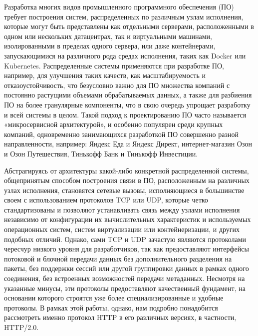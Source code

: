 \documentclass[times]{itmo-student-thesis}
\begin{document}

\tableofcontents

\startprefacepage

Разработка многих видов промышленного программного обеспечения (ПО) требует построения систем, распределенных по различным узлам исполнения,
которые могут быть представлены как отдельными серверами, расположенными в одном или нескольких датацентрах, так и виртуальными машинами, изолированными в пределах одного сервера,
или даже контейнерами, запускающимися на различного рода средах исполнения, таких как Docker или Kubernetes.
Распределенные системы применяются при разработке ПО, например, для улучшения таких качеств, как масштабируемость и отказоустойчивость,
что безусловно важно для ПО множества компаний с постоянно растущими объемами обрабатываемых данных,
а также для разбиения ПО на более гранулярные компоненты, что в свою очередь упрощает разработку и всей системы в целом.
Такой подход к проектированию ПО часто называется «микросервисной архитектурой», и особенно популярен среди крупных компаний,
одновременно занимающихся разработкой ПО совершенно разной направленности, например: Яндекс Еда и Яндекс Директ, интернет-магазин Озон и Озон Путешествия, Тинькофф Банк и Тинькофф Инвестиции. 

Абстрагируясь от архитектуры какой-либо конкретной распределенной системы, общепринятым способом построения связи в ПО, расположенным на различных узлах исполнения,
становятся сетевые вызовы, исполняющиеся в большинстве своем с использованием протоколов TCP или UDP, которые четко стандартизованы и позволяют устанавливать связь между
узлами исполнения независимо от конфигурации их вычислительных характеристик и используемых операционных систем, систем виртуализации или контейнеризации, и других подобных отличий.
Однако, сами TCP и UDP зачастую являются протоколами чересчур низкого уровня для разработчиков, так как предоставляют интерфейсы потоковой и блочной передачи данных
без дополнительного разделения на пакеты, без поддержки сессий или другой группировки данных в рамках одного соединения, без встроенных возможностей передачи метаданных.
Несмотря на указанные минусы, эти протоколы предоставляют качественный фундамент, на основании которого строятся уже более специализированные и удобные протоколы.
В рамках этой работы, однако, нам подробно понадобится рассмотреть именно протокол HTTP в его различных версиях, в частности, HTTP/2.0.
\end{document}
